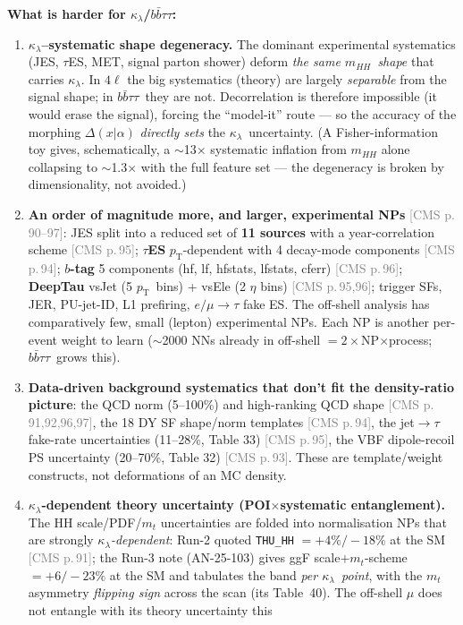 \documentclass[11pt]{article}
\newcommand{\kl}{\ensuremath{\kappa_\lambda}}
\newcommand{\mhh}{\ensuremath{m_{HH}}}
\newcommand{\bbtt}{\ensuremath{b\bar b\tau\tau}}
\newcommand{\ptt}{\ensuremath{p_{\mathrm T}}}
\newcommand{\pC}[1]{\textcolor{gray}{\small[CMS p.\,#1]}}
\begin{document}
\medskip\noindent\textbf{What is harder for \kl/\bbtt:}
\begin{enumerate}[leftmargin=1.4em]
\item \textbf{\kl--systematic shape degeneracy.} The dominant experimental systematics (JES, $\tau$ES, MET, signal
  parton shower) deform \emph{the same \mhh\ shape} that carries \kl. In $4\ell$ the big systematics (theory) are
  largely \emph{separable} from the signal shape; in \bbtt\ they are not. Decorrelation is therefore impossible
  (it would erase the signal), forcing the ``model-it'' route --- so the accuracy of the morphing
  $\Delta(x|\alpha)$ \emph{directly sets} the \kl\ uncertainty. (A Fisher-information toy gives, schematically,
  a $\sim$13$\times$ systematic inflation from $\mhh$ alone collapsing to $\sim$1.3$\times$ with the full feature
  set --- the degeneracy is broken by dimensionality, not avoided.)
\item \textbf{An order of magnitude more, and larger, experimental NPs} \pC{90--97}: JES split into a reduced set
  of \textbf{11 sources} with a year-correlation scheme \pC{95}; \textbf{$\tau$ES} \ptt-dependent with 4 decay-mode
  components \pC{94}; \textbf{$b$-tag} 5 components (hf, lf, hfstats, lfstats, cferr) \pC{96}; \textbf{DeepTau}
  vsJet (5 \ptt\ bins) + vsEle (2 $\eta$ bins) \pC{95,96}; trigger SFs, JER, PU-jet-ID, L1 prefiring, $e/\mu\to\tau$
  fake ES. The off-shell analysis has comparatively few, small (lepton) experimental NPs. Each NP is another
  per-event weight to learn ($\sim$2000 NNs already in off-shell $=2\times$NP$\times$process; \bbtt\ grows this).
\item \textbf{Data-driven background systematics that don't fit the density-ratio picture}: the QCD norm (5--100\%)
  and high-ranking QCD shape \pC{91,92,96,97}, the 18 DY SF shape/norm templates \pC{94}, the jet$\to\tau$ fake-rate
  uncertainties (11--28\%, Table 33) \pC{95}, the VBF dipole-recoil PS uncertainty (20--70\%, Table 32) \pC{93}.
  These are template/weight constructs, not deformations of an MC density.
\item \textbf{\kl-dependent theory uncertainty (POI$\times$systematic entanglement).} The HH scale/PDF/$m_t$
  uncertainties are folded into normalisation NPs that are strongly \emph{\kl-dependent}: Run-2 quoted
  \texttt{THU\_HH} $=+4\%/-18\%$ at the SM \pC{91}; the Run-3 note (AN-25-103) gives ggF scale$+m_t$-scheme
  $=+6/-23\%$ at the SM and tabulates the band \emph{per \kl\ point}, with the $m_t$ asymmetry \emph{flipping
  sign} across the scan (its Table~40). The off-shell $\mu$ does not entangle with its theory uncertainty this

\end{enumerate}
\end{document}
